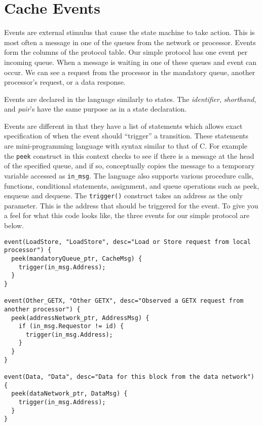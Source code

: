 \documentclass[11pt]{article}
\begin{document}
\section*{Cache Events}

Events are external stimulus that cause the state machine to take
action.  This is most often a message in one of the queues from the
network or processor.  Events form the columns of the protocol table.
Our simple protocol has one event per incoming queue.  When a message
is waiting in one of these queues and event can occur.  We can see a
request from the processor in the mandatory queue, another processor's
request, or a data response.

Events are declared in the language similarly to states.  The {\em
identifier}, {\em shorthand}, and {\em pair}'s have the same purpose
as in a state declaration.


Events are different in that they have a list of statements which
allows exact specification of when the event should ``trigger'' a
transition.  These statements are mini-programming language with
syntax similar to that of C.  For example the {\tt peek} construct in
this context checks to see if there is a message at the head of the
specified queue, and if so, conceptually copies the message to a
temporary variable accessed as {\tt in\_msg}.  The language also
supports various procedure calls, functions, conditional statements,
assignment, and queue operations such as peek, enqueue and dequeue.
The {\tt trigger()} construct takes an address as the only parameter.
This is the address that should be triggered for the event.  To give
you a feel for what this code looks like, the three events for our
simple protocol are below.

\begin{verbatim}
event(LoadStore, "LoadStore", desc="Load or Store request from local processor") {
  peek(mandatoryQueue_ptr, CacheMsg) {
    trigger(in_msg.Address);
  }
}

event(Other_GETX, "Other GETX", desc="Observed a GETX request from another processor") {
  peek(addressNetwork_ptr, AddressMsg) {
    if (in_msg.Requestor != id) {
      trigger(in_msg.Address);
    }
  }
}

event(Data, "Data", desc="Data for this block from the data network") {
  peek(dataNetwork_ptr, DataMsg) {
    trigger(in_msg.Address);
  }
}
\end{verbatim}
\end{document}
